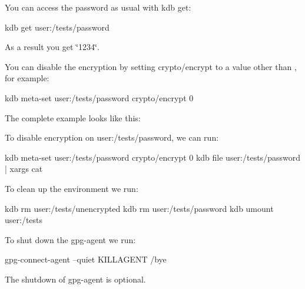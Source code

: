 You can access the password as usual with {\ttfamily kdb get}\+:


\begin{DoxyCode}
kdb get user:/tests/password
\end{DoxyCode}


As a result you get \char`\"{}1234\char`\"{}.

You can disable the encryption by setting {\ttfamily crypto/encrypt} to a value other than {}, for example\+:


\begin{DoxyCode}
kdb meta-set user:/tests/password crypto/encrypt 0
\end{DoxyCode}


The complete example looks like this\+:




To disable encryption on {\ttfamily user\+:/tests/password}, we can run\+:


\begin{DoxyCode}
kdb meta-set user:/tests/password crypto/encrypt 0
kdb file user:/tests/password | xargs cat
\end{DoxyCode}


To clean up the environment we run\+:


\begin{DoxyCode}
kdb rm user:/tests/unencrypted
kdb rm user:/tests/password
kdb umount user:/tests
\end{DoxyCode}


To shut down the {\ttfamily gpg-\/agent} we run\+:


\begin{DoxyCode}
gpg-connect-agent --quiet KILLAGENT /bye
\end{DoxyCode}


The shutdown of {\ttfamily gpg-\/agent} is optional. 